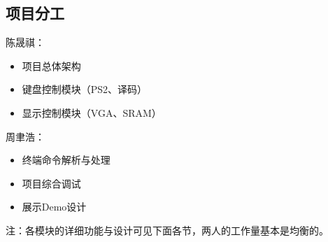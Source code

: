\subsection{项目分工}
\begin{minipage}[t]{0.45\textwidth}
陈晟祺：
\begin{itemize}
    \item 项目总体架构
    \item 键盘控制模块（PS2、译码）
    \item 显示控制模块（VGA、SRAM）
\end{itemize}
\end{minipage}
\begin{minipage}[t]{0.45\textwidth}
周聿浩：
\begin{itemize}
    \item 终端命令解析与处理
    \item 项目综合调试
    \item 展示Demo设计
\end{itemize}
\end{minipage}

\vspace{1em}
注：各模块的详细功能与设计可见下面各节，两人的工作量基本是均衡的。